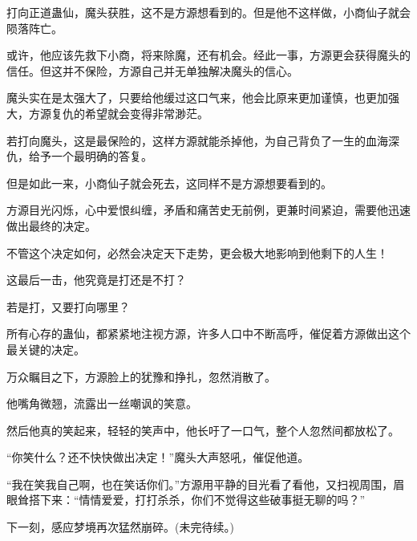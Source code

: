 \begin{this_body}
打向正道蛊仙，魔头获胜，这不是方源想看到的。但是他不这样做，小商仙子就会陨落阵亡。

或许，他应该先救下小商，将来除魔，还有机会。经此一事，方源更会获得魔头的信任。但这并不保险，方源自己并无单独解决魔头的信心。

魔头实在是太强大了，只要给他缓过这口气来，他会比原来更加谨慎，也更加强大，方源复仇的希望就会变得非常渺茫。

若打向魔头，这是最保险的，这样方源就能杀掉他，为自己背负了一生的血海深仇，给予一个最明确的答复。

但是如此一来，小商仙子就会死去，这同样不是方源想要看到的。

方源目光闪烁，心中爱恨纠缠，矛盾和痛苦史无前例，更兼时间紧迫，需要他迅速做出最终的决定。

不管这个决定如何，必然会决定天下走势，更会极大地影响到他剩下的人生！

这最后一击，他究竟是打还是不打？

若是打，又要打向哪里？

所有心存的蛊仙，都紧紧地注视方源，许多人口中不断高呼，催促着方源做出这个最关键的决定。

万众瞩目之下，方源脸上的犹豫和挣扎，忽然消散了。

他嘴角微翘，流露出一丝嘲讽的笑意。

然后他真的笑起来，轻轻的笑声中，他长吁了一口气，整个人忽然间都放松了。

“你笑什么？还不快快做出决定！”魔头大声怒吼，催促他道。

“我在笑我自己啊，也在笑话你们。”方源用平静的目光看了看他，又扫视周围，眉眼耸搭下来：“情情爱爱，打打杀杀，你们不觉得这些破事挺无聊的吗？”

下一刻，感应梦境再次猛然崩碎。(未完待续。)

\end{this_body}


